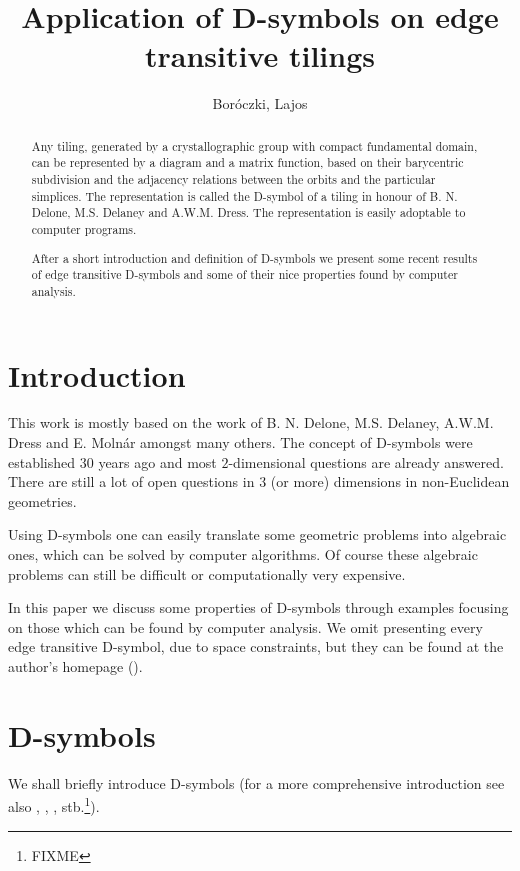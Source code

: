 \documentclass[12pt,a4paper]{article}
\numberwithin{equation}{section}
\theoremstyle{plain}%
\theoremstyle{definition}
\theoremstyle{remark}
\begin{document}
\title{Application of D-symbols on edge transitive tilings}
\author{Boróczki, Lajos}
\maketitle

\begin{abstract}
  Any tiling, generated by a crystallographic group with compact fundamental
  domain, can be represented by a diagram and a matrix function, based on
  their barycentric subdivision and the adjacency relations between the orbits
  and the particular simplices. The representation is called the D-symbol of a
  tiling in honour of B. N. Delone, M.S. Delaney and A.W.M. Dress. The
  representation is easily adoptable to computer programs.

  After a short introduction and definition of D-symbols we 
  present some recent results of edge transitive D-symbols and some of their
  nice properties found by computer analysis.
\end{abstract}

\section{Introduction}
This work is mostly based on the work of B. N. Delone, M.S. Delaney,
A.W.M. Dress and E. Molnár amongst many others. The concept of D-symbols were
established $30$ years ago and most $2$-dimensional questions are already
answered. There are still a lot of open questions in $3$ (or more) dimensions
in non-Euclidean geometries.

Using D-symbols one can easily translate some geometric problems into algebraic
ones, which can be solved by computer algorithms. Of course these algebraic
problems can still be difficult or computationally very expensive.

In this paper we discuss some properties of D-symbols through examples focusing
on those which can be found by computer analysis. We omit presenting every edge
transitive D-symbol, due to space constraints, but they can be found at the
author's homepage (\cite{MYHOME_edge_trans}).

\section{D-symbols}
We shall briefly introduce D-symbols (for a more comprehensive introduction see
also \cite{BSzK02}, \cite{DHM93}, \cite{M96}, stb.\footnote{FIXME}). 
\end{document}
